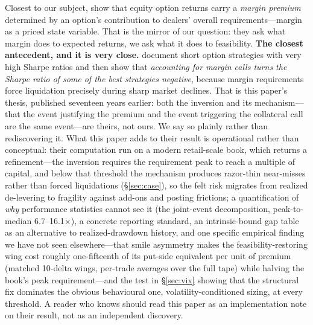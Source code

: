 \documentclass[11pt]{article}
\begin{document}
Closest to our subject, \citet{hitz} show that equity option returns carry a \emph{margin
premium} determined by an option's contribution to dealers' overall requirements---margin as a
priced state variable. That is the mirror of our question: they ask what margin does to
expected returns, we ask what it does to feasibility. \textbf{The closest antecedent, and it is very close.} \citet{ss} document short option
strategies with very high Sharpe ratios and then show that \emph{accounting for margin calls
turns the Sharpe ratio of some of the best strategies negative}, because margin requirements
force liquidation precisely during sharp market declines. That is this paper's thesis, published
seventeen years earlier: both the inversion and its mechanism---that the event justifying the
premium and the event triggering the collateral call are the same event---are theirs, not ours.
We say so plainly rather than rediscovering it. What this paper adds to their result is
operational rather than conceptual: their computation run on a modern retail-scale book, which
returns a refinement---the inversion requires the requirement peak to reach a multiple of
capital, and below that threshold the mechanism produces razor-thin near-misses rather than
forced liquidations (\S\ref{sec:case}), so the felt risk migrates from realized de-levering to
fragility against add-ons and posting frictions; a quantification of \emph{why} performance statistics cannot
see it (the joint-event decomposition, peak-to-median 6.7--16.1$\times$), a concrete reporting
standard, an intrinsic-bound gap table as an alternative to realized-drawdown history, and one
specific empirical finding we have not seen elsewhere---that smile asymmetry makes the
feasibility-restoring wing cost roughly one-fifteenth of its put-side equivalent per unit of
premium (matched 10-delta wings, per-trade averages over the full tape) while halving
the book's peak requirement---and the test in \S\ref{sec:vix} showing that the structural fix
dominates the obvious behavioural one, volatility-conditioned sizing, at every threshold. A reader who knows \citet{ss} should read this paper as an
implementation note on their result, not as an independent discovery.
\end{document}
